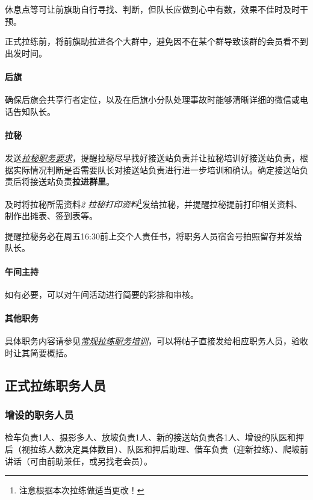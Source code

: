 \documentclass[UTF8]{ctexart}
\begin{document}
休息点等可让前旗助自行寻找、判断，但队长应做到心中有数，效果不佳时及时干预。

正式拉练前，将前旗助拉进各个大群中，避免因不在某个群导致该群的会员看不到出发时间。

\paragraph{后旗}

确保后旗会共享行者定位，以及在后旗小分队处理事故时能够清晰详细的微信或电话告知队长。

\paragraph{拉秘}

发送\href{https://chexie.net/bbs/content/?bid=7&tid=1062&p=1#7}{\textit{拉秘职务要求}}，提醒拉秘尽早找好接送站负责并让拉秘培训好接送站负责，根据实际情况判断是否需要队长对接送站负责进行进一步培训和确认。确定接送站负责后将接送站负责\textbf{拉进群里}。

及时将拉秘所需资料{\color{blue}\textit{2 拉秘打印资料}}\footnote{注意根据本次拉练做适当更改！}发给拉秘，并提醒拉秘提前打印相关资料、制作出摊表、签到表等。

提醒拉秘务必在周五16:30前上交个人责任书，将职务人员宿舍号拍照留存并发给队长。

\paragraph{午间主持} 如有必要，可以对午间活动进行简要的彩排和审核。

\paragraph{其他职务}

具体职务内容请参见\href{https://chexie.net/bbs/content/?bid=7&tid=1062&p=1}{\textit{常规拉练职务培训}}，可以将帖子直接发给相应职务人员，验收时让其简要概括。

\subsection{正式拉练职务人员}

\subsubsection{增设的职务人员}

检车负责1人、摄影多人、放坡负责1人、新的接送站负责各1人、增设的队医和押后（视拉练人数决定具体数目）、队医和押后助理、借车负责（迎新拉练）、爬坡前讲话（可由前助兼任，或另找老会员）。
\end{document}
